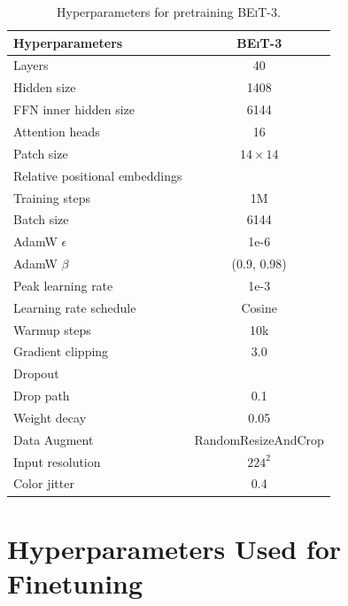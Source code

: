 \documentclass{article}
\newcommand{\xmark}{{\color{black}\ding{55}}}%
\newcommand\our{\textsc{BEiT-3}}
\begin{document}
\begin{table}[H]
\centering
\small
\begin{tabular}{l|c}
\toprule
\bf Hyperparameters & \bf \our{} \\
\midrule
Layers & 40 \\
Hidden size & 1408 \\
FFN inner hidden size & 6144 \\
Attention heads & 16 \\
Patch size & $14 \times 14$ \\
Relative positional embeddings & \xmark \\
\midrule
Training steps & 1M \\
Batch size & 6144 \\
AdamW $\epsilon$ & 1e-6 \\
AdamW $\beta$ & (0.9, 0.98) \\
Peak learning rate & 1e-3 \\
Learning rate schedule & Cosine \\
Warmup steps & 10k \\
\midrule
Gradient clipping & 3.0 \\
Dropout & \xmark \\
Drop path & 0.1 \\
Weight decay & 0.05 \\
\midrule
Data Augment & RandomResizeAndCrop \\
Input resolution & $224^2$ \\
Color jitter & 0.4 \\
\bottomrule
\end{tabular}
\vspace{2mm}
\caption{
Hyperparameters for pretraining \our{}.
}
\label{tbl:pretrain:hyperparams}
\end{table}


\section{Hyperparameters Used for Finetuning}
\end{document}
